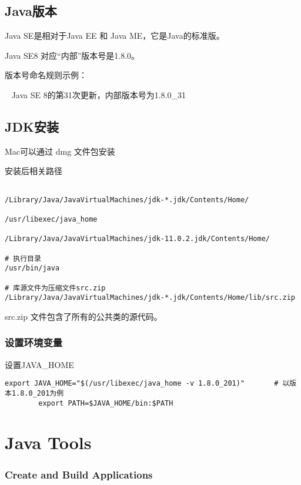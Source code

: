 \subsection{Java版本}

Java SE是相对于Java EE 和 Java ME，它是Java的标准版。

Java SE8 对应“内部”版本号是1.8.0。\newline

版本号命名规则示例：


~ Java SE 8的第31次更新，内部版本号为1.8.0\_31

\subsection{JDK安装}

Mac可以通过 dmg 文件包安装

安装后相关路径

\begin{lstlisting}[style=cshell]

/Library/Java/JavaVirtualMachines/jdk-*.jdk/Contents/Home/

/usr/libexec/java_home

/Library/Java/JavaVirtualMachines/jdk-11.0.2.jdk/Contents/Home/

# 执行目录
/usr/bin/java

# 库源文件为压缩文件src.zip
/Library/Java/JavaVirtualMachines/jdk-*.jdk/Contents/Home/lib/src.zip

\end{lstlisting}

src.zip 文件包含了所有的公共类的源代码。

\subsubsection{设置环境变量}

设置JAVA\_HOME

\begin{lstlisting}[style=cshell]
        export JAVA_HOME="$(/usr/libexec/java_home -v 1.8.0_201)"       # 以版本1.8.0_201为例
        export PATH=$JAVA_HOME/bin:$PATH
\end{lstlisting}


\section{Java Tools}

\subsubsection{Create and Build Applications}

